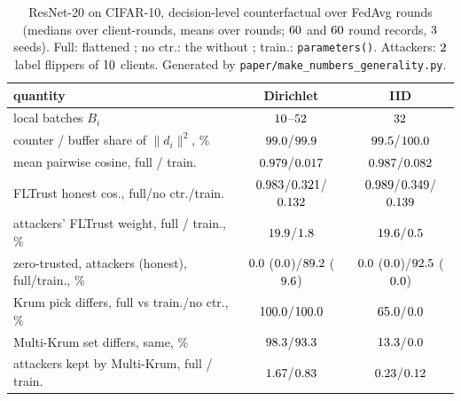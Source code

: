 \documentclass[journal]{IEEEtran}
\begin{document}
\begin{table}[t]
\centering
\caption{ResNet-20 on CIFAR-10, decision-level counterfactual over FedAvg rounds
(medians over client-rounds, means over rounds; $60$ and
$60$ round records, $3$ seeds). Full: flattened \sd{}; no ctr.: the
\sd{} without \nbt{}; train.: \texttt{parameters()}. Attackers: $2$ label
flippers of $10$ clients. Generated by
\texttt{paper/make\_numbers\_generality.py}.}
\label{tab:gen}
\scriptsize
\setlength{\tabcolsep}{2pt}
\begin{tabular}{@{}p{}cc@{}}
\toprule
quantity & Dirichlet & IID \\
\midrule
local batches $B_i$ & $10$--$52$ & $32$ \\
counter / buffer share of $\|d_i\|^2$, \% & $99.0$/$99.9$ & $99.5$/$100.0$ \\
mean pairwise cosine, full / train. & $0.979$/$0.017$ & $0.987$/$0.082$ \\
FLTrust honest cos., full/no ctr./train. & $0.983$/$0.321$/$0.132$ & $0.989$/$0.349$/$0.139$ \\
attackers' FLTrust weight, full / train., \% & $19.9$/$1.8$ & $19.6$/$0.5$ \\
zero-trusted, attackers (honest), full/train., \% & $0.0$ ($0.0$)/$89.2$ ($9.6$) & $0.0$ ($0.0$)/$92.5$ ($0.0$) \\
Krum pick differs, full vs train./no ctr., \% & $100.0$/$100.0$ & $65.0$/$0.0$ \\
Multi-Krum set differs, same, \% & $98.3$/$93.3$ & $13.3$/$0.0$ \\
attackers kept by Multi-Krum, full / train. & $1.67$/$0.83$ & $0.23$/$0.12$ \\
\bottomrule
\end{tabular}
\end{table}
\end{document}
